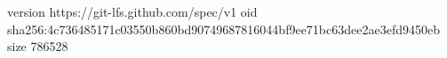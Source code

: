 version https://git-lfs.github.com/spec/v1
oid sha256:4c736485171c03550b860bd90749687816044bf9ee71bc63dee2ae3efd9450eb
size 786528
